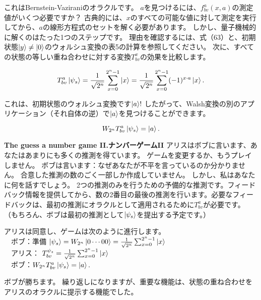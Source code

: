 これはBernstein-Vaziraniのオラクルです。 $a$を見つけるには、$f_{bv}^{a} (x, a) $の測定値がいくつ必要ですか？
古典的には、$x$のすべての可能な値に対して測定を実行してから、$a$の線形方程式のセットを解く必要があります。 しかし、量子機械的に解くのはたった1つのステップです。
理由を確認するには、式（63）と、初期状態$\ket{y} \ne \ket{0}$のウォルシュ変換の表5の計算を参照してください。
  次に、すべての状態の等しい重ね合わせに対する変換$T_{bv}^{x} $の効果を比較します。
  
\begin{equation}
\label{100}
T_{bv}^a \ket{\psi_s} = \frac{1}{\sqrt{2^n}} \sum_{x=0}^{2^n -1} \ket{x} =  \frac{1}{\sqrt{2^n}} \sum_{x=0}^{2^n -1}  (-1) ^{x \cdot a} \ket{x}.
\end{equation}
 
これは、初期状態のウォルシュ変換です$\ket{a}!$ したがって、Walsh変換の別のアプリケーション（それ自体の逆）で$\ket{a}$を見つけることができます。

\begin{equation}
\label{101}
W_{2^n} T^a_{bv} \ket{\psi_s} = \ket{a}.
\end{equation} 

\textbf{The guess a number game II.ナンバーゲームII}
アリスはボブに言います、あなたはあまりにも多くの推測を得ています。 ゲームを変更するか、もうプレイしません。 ボブは言います：なぜあなたが不平を言っているのか分かりません。 合意した推測の数のごく一部しか作成していません。 しかし、私はあなたに何を話すでしょう。
2つの推測のみを行うための予備的な推測です。フィードバック情報を提供してから、数の2番目の最後の推測を行います。必要なフィードバックは、最初の推測にオラクルとして適用されるために$ T_{bv}^a$が必要です。
（もちろん、ボブは最初の推測として$\ket{\psi_s}$を提出する予定です。）

アリスは同意し、ゲームは次のように進行します。\\
\ \   ボブ：準備 $\ket{\psi_s} = W_{2^n} \ket{0 \cdots 00}  = \frac{1}{\sqrt{2^n}} \sum_{x=0}^{2^n -1} \ket{x} $　\\
\ \   アリス： $T_{bv}^{\psi_s} = \frac{1}{\sqrt{2^n}} \sum_{x=0}^{2^n -1} \ket{x} $ \\
\ \   ボブ：$W_{2^n} T^a_{bv} \ket{\psi_s} = \ket{a} .$ 
  
ボブが勝ちます。 繰り返しになりますが、重要な機能は、状態の重ね合わせをアリスのオラクルに提示する機能でした。
